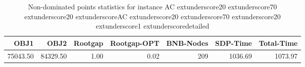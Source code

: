 \begin{table}
\caption{Non-dominated points statistics for instance AC	extunderscore20	extunderscore70	extunderscore20	extunderscoreAC	extunderscore20	extunderscore70	extunderscore20	extunderscore1	extunderscoredetailed}
\label{tab:stats/AC_20_70_20_AC_20_70_20_1_detailed}
\begin{tabular}{rrrrrrr}
\toprule
OBJ1 & OBJ2 & Rootgap & Rootgap-OPT & BNB-Nodes & SDP-Time & Total-Time \\
\midrule
75043.50 & 84329.50 & 1.00 & 0.02 & 209 & 1036.69 & 1073.97 \\
\bottomrule
\end{tabular}
\end{table}
